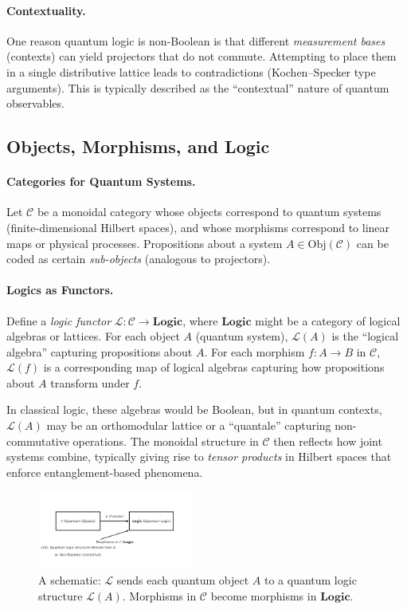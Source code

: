 \documentclass[12pt]{article}
\begin{document}
\paragraph{Contextuality.}  
One reason quantum logic is non-Boolean is that different \emph{measurement bases} (contexts) can yield projectors that do not commute. Attempting to place them in a single distributive lattice leads to contradictions (Kochen--Specker type arguments). This is typically described as the ``contextual'' nature of quantum observables.

\subsection{Objects, Morphisms, and Logic}

\paragraph{Categories for Quantum Systems.}
Let $\mathcal{C}$ be a monoidal category whose objects correspond to quantum systems (finite-dimensional Hilbert spaces), and whose morphisms correspond to linear maps or physical processes. Propositions about a system $A \in \mathrm{Obj}(\mathcal{C})$ can be coded as certain \emph{sub-objects} (analogous to projectors).

\paragraph{Logics as Functors.} 
Define a \emph{logic functor} $\mathcal{L}: \mathcal{C} \to \mathbf{Logic}$, where $\mathbf{Logic}$ might be a category of logical algebras or lattices. For each object $A$ (quantum system), $\mathcal{L}(A)$ is the ``logical algebra'' capturing propositions about $A$. For each morphism $f: A \to B$ in $\mathcal{C}$, $\mathcal{L}(f)$ is a corresponding map of logical algebras capturing how propositions about $A$ transform under $f$. 

In classical logic, these algebras would be Boolean, but in quantum contexts, $\mathcal{L}(A)$ may be an orthomodular lattice or a ``quantale'' capturing non-commutative operations. The monoidal structure in $\mathcal{C}$ then reflects how joint systems combine, typically giving rise to \emph{tensor products} in Hilbert spaces that enforce entanglement-based phenomena.

\begin{figure}[h]
\centering
\includegraphics[width=0.45\textwidth]{logic-functor-diagram.png}
\caption{A schematic: $\mathcal{L}$ sends each quantum object $A$ to a quantum logic structure $\mathcal{L}(A)$. 
Morphisms in $\mathcal{C}$ become morphisms in $\mathbf{Logic}$.}
\label{fig:LogicFunctor}
\end{figure}
\end{document}
